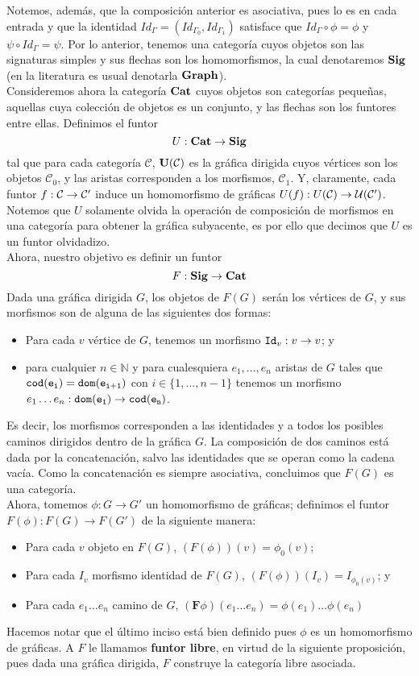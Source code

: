 \documentclass[../main.tex]{subfiles}
\begin{document}
\noindent Notemos, además, que la composición anterior es asociativa, pues lo es en cada entrada y que la identidad $Id_\Gamma=(Id_{\Gamma_0}, Id_{\Gamma_1})$ 
satisface que $Id_\Gamma \circ \phi = \phi$ y $\psi \circ Id_\Gamma = \psi$. Por lo anterior, tenemos una categoría cuyos objetos son las signaturas simples y sus flechas son los homomorfismos, la cual denotaremos $\bf{Sig}$ (en la literatura es usual denotarla $\bf{Graph}$).\\
Consideremos ahora la categoría \( \bf{Cat} \) cuyos objetos son categorías pequeñas, aquellas cuya colección de objetos es un conjunto, y las flechas son los funtores entre ellas. Definimos el funtor
\[
	U : \bf{Cat} \to \bf{Sig}
\]
tal que para cada categoría $\mathcal{C}$, $\bf{U}(\mathcal{C})$ es la gráfica dirigida cuyos vértices son los objetos $\mathcal{C}_0$, y las aristas corresponden a los morfismos, $\mathcal{C}_1$. Y, claramente, cada funtor $f: \cal{C} \to \cal{C'}$ induce un homomorfismo de gráficas $U (f): U(\cal{C}) \to U(\cal{C'})$. \\
Notemos que $U$ solamente olvida la operación de composición de morfismos en una categoría para obtener la gráfica subyacente, es por ello que  decimos que $U$ es un funtor olvidadizo. \\
Ahora, nuestro objetivo es definir un funtor $$F: \bf{Sig} \to \bf{Cat}$$
Dada una gráfica dirigida $G$, los objetos de $F(G)$ serán los vértices de $G$, y sus morfismos son de alguna de las siguientes dos formas:
\begin{itemize}
	\item Para cada $v$ vértice de $G$, tenemos un morfismo $\texttt{Id}_v: v \to v$; y
	\item para cualquier $n \in \mathbb{N}$ y para cualesquiera $e_1, ... , e_n$ aristas de $G$ tales que $\tt{cod} (e_i)=\tt{dom} (e_{i+1})$ con $i \in \{ 1, ..., n-1\}$ tenemos un morfismo $e_1 \dots e_n : \tt{dom} (e_1) \to \tt{cod} (e_n)$.
\end{itemize}
Es decir, los morfismos corresponden a las identidades y a todos los posibles caminos dirigidos dentro de la gráfica $G$. La composición de dos caminos está dada por la concatenación, salvo las identidades que se operan como la cadena vacía. Como la concatenación es siempre asociativa, concluimos que $F(G)$ es una categoría. \\
Ahora, tomemos $\phi: G \to G'$ un homomorfismo de gráficas; definimos el funtor $F(\phi): F(G) \to F(G')$ de la siguiente manera:   
\begin{itemize}
	\item Para cada $v$ objeto en $F (G)$, $(F(\phi))(v)=\phi_0(v) $;
	\item Para cada $I_v$ morfismo identidad de $F (G)$, $(F(\phi))(I_v)=I_{\phi_0(v)} $; y 
	\item Para cada $e_1 \dots e_n$ camino de $G$, $(\mathbf{F}\phi)(e_1 \dots e_n)=\phi(e_1) \dots \phi(e_n)$
\end{itemize}
Hacemos notar que el último inciso está bien definido pues $\phi$ es un homomorfismo de gráficas. A $F$ le llamamos \textbf{funtor libre}, en virtud de la siguiente proposición, pues dada una gráfica dirigida, $F$ construye la categoría libre asociada. 
\end{document}
